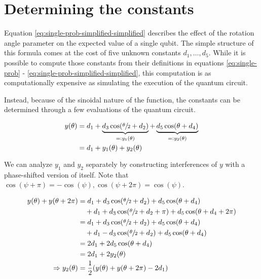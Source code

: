 \section{Determining the constants}
\label{sec:constants}
Equation \ref{eq:single-prob-simplified-simplified} describes the effect of the
rotation angle parameter on the expected value of a single qubit.
The simple structure of this formula comes at the cost of five unknown
constants $d_1, \dots, d_5$.
While it is possible to compute those constants from their definitions in
equations \ref{eq:single-prob} - \ref{eq:single-prob-simplified-simplified},
this computation is as computationally expensive as simulating the execution of
the quantum circuit.

Instead, because of the sinoidal nature of the function, the constants can be
determined through a few evaluations of the quantum circuit.

\begin{equation}
    \label{eq:y}
    \begin{split}
        y(\theta)
            &= d_1 + \underbrace{d_3 \cos(\sfrac\theta2 + d_2)}_{=: y_1(\theta)} + \underbrace{d_5 \cos(\theta + d_4)}_{=: y_2(\theta)}\\
            &= d_1 + y_1(\theta) + y_2(\theta)
    \end{split}
\end{equation}

We can analyze $y_1$ and $y_2$ separately by constructing interferences of $y$
with a phase-shifted version of itself.
Note that
$\cos(\psi + \pi) = -\cos(\psi), \cos(\psi + 2\pi) = \cos(\psi)$.

\begin{equation}
    \label{eq:d1+y2}
    \begin{split}
        y(\theta) + y(\theta + 2\pi)
            &= d_1 + d_3 \cos(\sfrac\theta2 + d_2) + d_5 \cos(\theta + d_4)\\
                &\quad + d_1 + d_3 \cos(\sfrac\theta2 + d_2 + \pi) + d_5 \cos(\theta + d_4 + 2\pi)\\
            &= d_1 + d_3 \cos(\sfrac\theta2 + d_2) + d_5 \cos(\theta + d_4)\\
                &\quad + d_1 - d_3 \cos(\sfrac\theta2 + d_2) + d_5 \cos(\theta + d_4)\\
            &= 2 d_1 + 2 d_5 \cos(\theta + d_4)\\
            &= 2 d_1 + 2 y_2(\theta)\\
        \Rightarrow y_2(\theta) &= \frac12 (y(\theta) + y(\theta + 2\pi) - 2 d_1)
    \end{split}
\end{equation}

